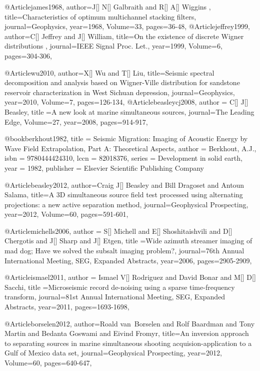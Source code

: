 @Article{james1968,
  author={J[] N[] Galbraith and R[] A[] Wiggins },
  title={Characteristics of optimum multichannel stacking filters},
  journal={Geophysics},
  year=1968,
  Volume=33,
  pages={36-48},
}
@Article{jeffrey1999,
  author={C[] Jeffrey and J[] William},
  title={On the existence of discrete Wigner distributions
},
  journal={IEEE Signal Proc. Let.},
  year=1999,
  Volume=6,
  pages={304-306},
}

@Article{wu2010,
  author={X[] Wu and T[] Liu},
  title={Seismic spectral decomposition and analysis based on Wigner-Ville distribution for sandstone reservoir characterization in West Sichuan depression},
  journal={Geophysics},
  year=2010,
  Volume=7,
  pages={126-134},
}
@Article{beasleycj2008,
  author = {C[] J[] Beasley},
  title ={A new look at marine simultaneous sources},
  journal={The Leading Edge},
  Volume=27,
  year=2008,
  pages={914-917},
}

@book{berkhout1982,
title     = {Seismic Migration: Imaging of Acoustic Energy by Wave Field Extrapolation, Part A: Theoretical Aspects},
author    = {Berkhout, A.J.},
isbn      = {9780444424310},
lccn      = {82018376},
series    = {Development in solid earth},
year      = {1982},
publisher = {Elsevier Scientific Publishing Company}
}

@Article{beasley2012,
  author={Craig J[] Beasley and Bill Dragoset and Antoun Salama},
  title={A 3{D} simultaneous source field test processed using alternating projections: a new active separation method},
  journal={Geophysical Prospecting},
  year=2012,
  Volume=60,
  pages={591-601},
}

@Article{michells2006,
  author = {S[] Michell and E[] Shoshitaishvili and D[] Chergotis and J[] Sharp and J[] Etgen},
  title ={Wide azimuth streamer imaging of mad dog; Have we solved the subsalt imaging problem?},
  journal={76th Annual International Meeting, SEG, Expanded Abstracts},
  year=2006,
  pages={2905-2909},
}

@Article{ismael2011,
  author = {Ismael V[] Rodriguez and David Bonar and M[] D[] Sacchi},
  title ={Microseismic record de-noising using a sparse time-frequency transform},
  journal={81st Annual International Meeting, SEG, Expanded Abstracts},
  year=2011,
  pages={1693-1698},
}

@Article{borselen2012,
  author={Roald van~Borselen and Rolf Baardman and Tony Martin and Bedanta Goswami and Eivind Fromyr},
  title={An inversion approach to separating sources in marine simultaneous shooting acquision-application to a Gulf of Mexico data set},
  journal={Geophysical Prospecting},
  year=2012,
  Volume=60,
  pages={640-647},
}

